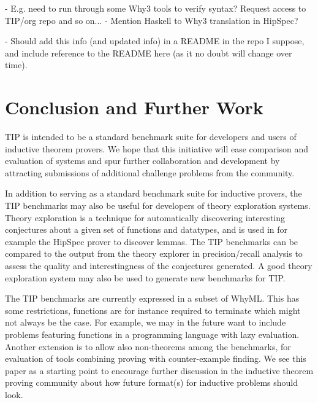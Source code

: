 \documentclass{llncs}
\begin{document}
- E.g. need to run through some Why3 tools to verify syntax? Request access to TIP/org repo and so on...
- Mention Haskell to Why3 translation in HipSpec?

- Should add this info (and updated info) in a README in the repo I suppose, and include reference to the README here (as it no doubt will change over time).

\section{Conclusion and Further Work}
TIP is intended to be a standard benchmark suite for developers and users of inductive theorem provers. We hope that this initiative will ease comparison and evaluation of systems and spur further collaboration and development by attracting submissions of additional challenge problems from the community. 

In addition to serving as a standard benchmark suite for inductive provers, the TIP benchmarks may also be useful for developers of theory exploration systems. Theory exploration is a technique for automatically discovering interesting conjectures about a given set of functions and datatypes, and is used in for example the HipSpec prover to discover lemmas. The TIP benchmarks can be compared to the output from the theory explorer in precision/recall analysis to assess the quality and interestingness of the conjectures generated. A good theory exploration system may also be used to generate new benchmarks for TIP.

The TIP benchmarks are currently expressed in a subset of WhyML. This has some restrictions, functions are for instance required to terminate which might not always be the case. For example, we may in the future want to include problems featuring functions in a programming language with lazy evaluation. Another extension is to allow also non-theorems among the benchmarks, for evaluation of tools combining proving with counter-example finding. We see this paper as a starting point to encourage further discussion in the inductive theorem proving community about how future format(s) for inductive problems should look.





\end{document}
